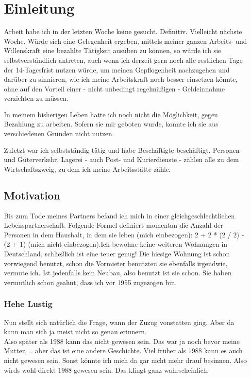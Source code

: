 \section{Einleitung}
Arbeit habe ich in der letzten Woche keine gesucht. Definitiv. Vielleicht nächste Woche. Würde sich eine Gelegenheit ergeben, mittels meiner ganzen Arbeits- und Willenskraft eine bezahlte Tätigkeit ausüben zu können, so würde ich sie selbstverständlich antreten, auch wenn ich derzeit gern noch alle restlichen Tage der 14-Tagesfrist nutzen würde, um meinen Gepflogenheit nachzugehen und darüber zu sinnieren, wie ich meine Arbeitskraft noch besser einsetzen könnte, ohne auf den Vorteil einer - nicht unbedingt regelmäßigen - Geldeinnahme verzichten zu müssen.

In meinem bisherigen Leben hatte ich noch nicht die Möglichkeit, gegen Bezahlung zu arbeiten. Sofern sie mir geboten wurde, konnte ich sie aus verschiedenen Gründen nicht nutzen.

Zuletzt war ich selbstständig tätig und habe Beschäftigte beschäftigt.
Personen- und Güterverkehr, Lagerei - auch Post- und Kurierdienste - zählen alle zu dem Wirtschaftszweig, zu dem ich meine Arbeitsstätte zähle.


\subsection{Motivation}
Bis zum Tode meines Partners befand ich mich in einer gleichgeschlechtlichen Lebenspartnerschaft. Folgende Formel definiert momentan die Anzahl der Personen in dem Haushalt, in dem sie leben (mich einbezogen): 2 + 2 * (2 / 2) - (2 + 1) (mich nicht einbezogen).Ich bewohne keine weiteren Wohnungen in Deutschland, schließlich ist eine teuer genug! 
Die hiesige Wohnung ist schon vorwiegend benutzt, schon die Vormieter benutzten sie ebenfalls irgendwie, vermute ich. Ist jedenfalls kein Neubau, also benutzt ist sie schon.
Sie haben vermutlich schon geahnt, dass ich vor 1955 zugezogen bin. \cite{Bur03}

\subsubsection{Hehe Lustig}
Nun stellt sich natürlich die Frage, wann der Zuzug vonstatten ging. Aber da kann man sich ja meist nicht so genau erinnern. \\
Also später als 1988 kann das nicht gewesen sein. Das war ja noch bevor meine Mutter, .. aber das ist eine andere Geschichte. Viel früher als 1988 kann es auch nicht gewesen sein. Sonst könnte ich mich da gar nicht mehr drauf besinnen. Also wirds wohl direkt 1988 gewesen sein. Das klingt ganz wahrscheinlich.



